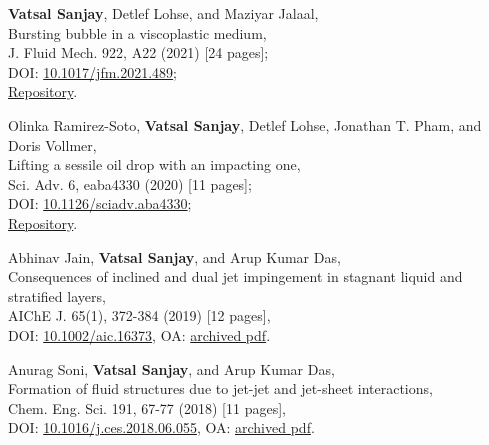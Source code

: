 \documentclass[10pt,a4paper,colorlinks,linkcolor=blue,urlcolor=blue,citecolor=blue]{moderncv}
\begin{document}
\begin{enumerate}[leftmargin=1.5em,label=\textbf{[\arabic*]}]
	\item \textbf{Vatsal Sanjay}, Detlef Lohse, and Maziyar Jalaal,\\
	Bursting bubble in a viscoplastic medium,\\
	J. Fluid Mech. 922, A22 (2021) [24 pages];\\
	\faFile\hspace{0.2em}DOI: \href{https://doi.org/10.1017/jfm.2021.489}{10.1017/jfm.2021.489};\\
	\faGithub\hspace{0.2em}\href{https://github.com/VatsalSy/Bursting-Bubble-In-a-Viscoplastic-Medium}{Repository}.

	\item Olinka Ramirez-Soto, \textbf{Vatsal Sanjay}, Detlef Lohse, Jonathan T. Pham, and Doris Vollmer,\\
	Lifting a sessile oil drop with an impacting one,\\
	Sci. Adv. 6, eaba4330 (2020) [11 pages];\\
	\faFile\hspace{0.2em}DOI: \href{https://doi.org/10.1126/sciadv.aba4330}{10.1126/sciadv.aba4330};\\
	\faGithub\hspace{0.2em}\href{https://github.com/VatsalSy/Lifting-a-sessile-drop}{Repository}.

	\item Abhinav Jain, \textbf{Vatsal Sanjay}, and Arup Kumar Das,\\
	Consequences of inclined and dual jet impingement in stagnant liquid and stratified layers,\\
	AIChE J. 65(1), 372-384 (2019) [12 pages],\\
	\faLock\hspace{0.2em}DOI: \href{https://doi.org/10.1002/aic.16373}{10.1002/aic.16373}, \faFile\hspace{0.2em}OA: \href{https://tinyurl.com/24p5dy8s}{archived pdf}.

	\item Anurag Soni, \textbf{Vatsal Sanjay}, and Arup Kumar Das,\\
	Formation of fluid structures due to jet-jet and jet-sheet interactions,\\
	Chem. Eng. Sci. 191, 67-77 (2018) [11 pages],\\
	\faLock\hspace{0.2em}DOI: \href{https://doi.org/10.1016/j.ces.2018.06.055}{10.1016/j.ces.2018.06.055}, \faFile\hspace{0.2em}OA: \href{https://tinyurl.com/2bv5fznd}{archived pdf}.


\end{enumerate}
\end{document}
